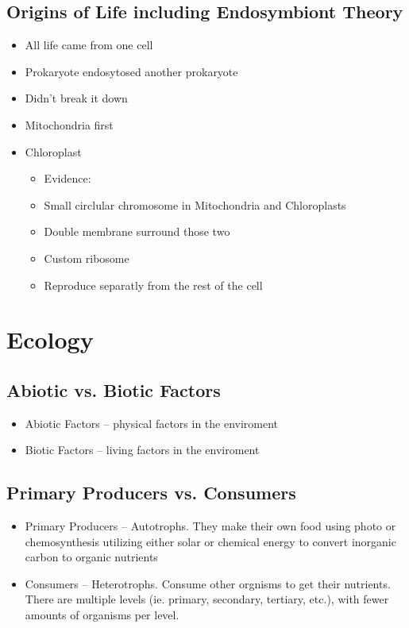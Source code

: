 \documentclass{article}
\begin{document}
\subsection{Origins of Life including Endosymbiont Theory}
\begin{itemize}
\item All life came from one cell
\item Prokaryote endosytosed another prokaryote
\item Didn't break it down
\item Mitochondria first
\item Chloroplast
\begin{itemize}
\item Evidence:
\item Small circlular chromosome in Mitochondria and Chloroplasts
\item Double membrane surround those two
\item Custom ribosome
\item Reproduce separatly from the rest of the cell
\end{itemize}
\end{itemize}

\section{Ecology}

\subsection{Abiotic vs. Biotic Factors}
\begin{itemize}
\item Abiotic Factors -- physical factors in the enviroment
\item Biotic  Factors -- living factors in the enviroment
\end{itemize}

\subsection{Primary Producers vs. Consumers}
\begin{itemize}
\item Primary Producers -- Autotrophs. They make their own food using photo or chemosynthesis utilizing either solar or chemical energy to convert inorganic carbon to organic nutrients
\item Consumers -- Heterotrophs. Consume other orgnisms to get their nutrients. There are multiple levels (ie. primary, secondary, tertiary, etc.), with fewer amounts of organisms per level.
\end{itemize}
\end{document}
